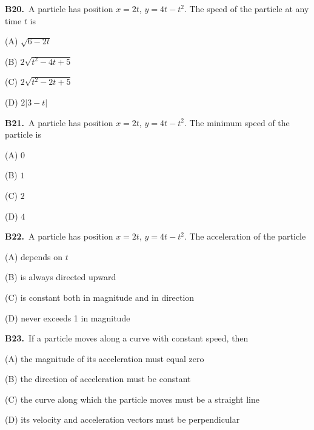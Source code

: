 \documentclass[11pt]{article}
\begin{document}
\bigskip\noindent\textbf{B20.}\ A particle has position $x=2t$, $y=4t-t^2$. The speed of the particle at any time $t$ is
\begin{list}{}{\setlength{\leftmargin}{3em}\setlength{\labelwidth}{2.5em}\setlength{\itemsep}{0pt}\setlength{\topsep}{2pt}}
\item[(A)] $\sqrt{6-2t}$
\item[(B)] $2\sqrt{t^2-4t+5}$
\item[(C)] $2\sqrt{t^2-2t+5}$
\item[(D)] $2|3-t|$
\end{list}

\bigskip\noindent\textbf{B21.}\ A particle has position $x=2t$, $y=4t-t^2$. The minimum speed of the particle is
\begin{list}{}{\setlength{\leftmargin}{3em}\setlength{\labelwidth}{2.5em}\setlength{\itemsep}{0pt}\setlength{\topsep}{2pt}}
\item[(A)] $0$
\item[(B)] $1$
\item[(C)] $2$
\item[(D)] $4$
\end{list}

\bigskip\noindent\textbf{B22.}\ A particle has position $x=2t$, $y=4t-t^2$. The acceleration of the particle
\begin{list}{}{\setlength{\leftmargin}{3em}\setlength{\labelwidth}{2.5em}\setlength{\itemsep}{0pt}\setlength{\topsep}{2pt}}
\item[(A)] depends on $t$
\item[(B)] is always directed upward
\item[(C)] is constant both in magnitude and in direction
\item[(D)] never exceeds 1 in magnitude
\end{list}

\bigskip\noindent\textbf{B23.}\ If a particle moves along a curve with constant speed, then
\begin{list}{}{\setlength{\leftmargin}{3em}\setlength{\labelwidth}{2.5em}\setlength{\itemsep}{0pt}\setlength{\topsep}{2pt}}
\item[(A)] the magnitude of its acceleration must equal zero
\item[(B)] the direction of acceleration must be constant
\item[(C)] the curve along which the particle moves must be a straight line
\item[(D)] its velocity and acceleration vectors must be perpendicular
\end{list}
\end{document}
